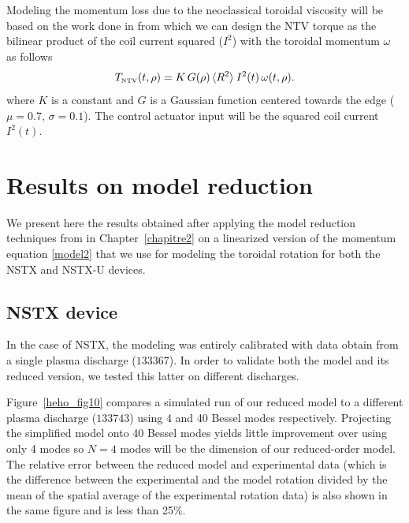 \documentclass[12pt,lot, lof]{puthesis}
\begin{document}
Modeling the momentum loss due to the neoclassical toroidal viscosity will be based on the work done in \cite{Zhu06} from which we can design the NTV torque as the bilinear product of the coil current squared ($I^2$) with the toroidal momentum $\omega$ as follows
\begin{equation}
T_\textrm{\tiny NTV}  (t, \rho) =   K \, G(\rho) \,  \langle R^2 \rangle \:  I^2(t) \,\omega (t, \rho) .
\label{model8}
\end{equation}
where $K$ is a constant and $G$ is a Gaussian function centered towards the edge ($\mu =0.7$, $\sigma =0.1$). The control actuator input will be the squared coil current $I^2(t)$.



\section{Results on model reduction}

We present here the results obtained after applying the model reduction techniques from in Chapter~\ref{chapitre2} on a linearized version of the momentum equation \eqref{model2} that we use for modeling the toroidal rotation for both the NSTX and NSTX-U devices.

\subsection{NSTX device}
In the case of NSTX, the modeling was entirely calibrated with data obtain from a single plasma discharge ($133367$). In order to validate both the model and its reduced version, we tested this latter on different discharges.

Figure~\ref{heho_fig10} compares a simulated run of our reduced model to a different plasma discharge ($133743$) using 4 and 40 Bessel modes respectively.
Projecting the simplified model onto 40 Bessel modes yields little improvement over using only 4 modes so $N=4$ modes will be the dimension of our reduced-order model.
The relative error between the reduced model and experimental data (which is the difference between the experimental and the model rotation divided by the mean of the spatial average of the experimental rotation data) is also shown in the same figure and is less than 25\%.
\end{document}
